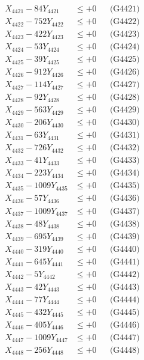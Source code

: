 \documentclass[a4paper,10pt]{article}
\begin{document}
{\begin{align}
\allowbreak
X_{4421} - 84Y_{4421} &\leq +0 && \text{(G4421)} \\
X_{4422} - 752Y_{4422} &\leq +0 && \text{(G4422)} \\
X_{4423} - 422Y_{4423} &\leq +0 && \text{(G4423)} \\
X_{4424} - 53Y_{4424} &\leq +0 && \text{(G4424)} \\
X_{4425} - 39Y_{4425} &\leq +0 && \text{(G4425)} \\
X_{4426} - 912Y_{4426} &\leq +0 && \text{(G4426)} \\
X_{4427} - 114Y_{4427} &\leq +0 && \text{(G4427)} \\
X_{4428} - 92Y_{4428} &\leq +0 && \text{(G4428)} \\
X_{4429} - 563Y_{4429} &\leq +0 && \text{(G4429)} \\
X_{4430} - 206Y_{4430} &\leq +0 && \text{(G4430)} \\
\allowbreak
X_{4431} - 63Y_{4431} &\leq +0 && \text{(G4431)} \\
X_{4432} - 726Y_{4432} &\leq +0 && \text{(G4432)} \\
X_{4433} - 41Y_{4433} &\leq +0 && \text{(G4433)} \\
X_{4434} - 223Y_{4434} &\leq +0 && \text{(G4434)} \\
X_{4435} - 1009Y_{4435} &\leq +0 && \text{(G4435)} \\
X_{4436} - 57Y_{4436} &\leq +0 && \text{(G4436)} \\
X_{4437} - 1009Y_{4437} &\leq +0 && \text{(G4437)} \\
X_{4438} - 48Y_{4438} &\leq +0 && \text{(G4438)} \\
X_{4439} - 695Y_{4439} &\leq +0 && \text{(G4439)} \\
X_{4440} - 319Y_{4440} &\leq +0 && \text{(G4440)} \\
\allowbreak
X_{4441} - 645Y_{4441} &\leq +0 && \text{(G4441)} \\
X_{4442} - 5Y_{4442} &\leq +0 && \text{(G4442)} \\
X_{4443} - 42Y_{4443} &\leq +0 && \text{(G4443)} \\
X_{4444} - 77Y_{4444} &\leq +0 && \text{(G4444)} \\
X_{4445} - 432Y_{4445} &\leq +0 && \text{(G4445)} \\
X_{4446} - 405Y_{4446} &\leq +0 && \text{(G4446)} \\
X_{4447} - 1009Y_{4447} &\leq +0 && \text{(G4447)} \\
X_{4448} - 256Y_{4448} &\leq +0 && \text{(G4448)} \\

\end{align}}
\end{document}
